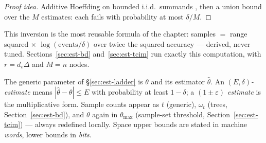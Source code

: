 \begin{proof}[Proof idea]
Additive Hoeffding on bounded i.i.d.\ summands
\citep{estimation-theory-bg3,estimation-theory-bg4}, then a union bound over the $M$ estimates:
each fails with probability at most $\delta/M$.
\end{proof}

This inversion is the most reusable formula of the chapter: samples $=$ range squared $\times$
$\log(\text{events}/\delta)$ over twice the squared accuracy --- derived, never tuned.
Sections~\ref{sec:est-bd} and~\ref{sec:est-tcim} run exactly this computation, with
$r = d_v\Delta$ and $M = n$ nodes.

\begin{widefigure}[t]
\pgfplotsset{compat=1.15}
\caption{The bias--variance ledger: shrinking or capping an unbiased estimator
($\hat\theta \mapsto \lambda\hat\theta$, or the truncations of Sections~\ref{sec:est-fp}
and~\ref{sec:est-sublime}) buys variance at the price of bias; the MSE-optimal
$\lambda^\ast = \theta^2/(\theta^2+\sigma^2)$ balances the two curves, and truncation
estimators sit at an interior point chosen so the bias lands inside the stated factor.}
\label{fig:est-mse}
\end{widefigure}

\begin{remarkbox}[Notation]
The generic parameter of \S\ref{sec:est-ladder} is $\theta$ and its estimator $\hat\theta$. An
\emph{$(E,\delta)$-estimate} means $|\hat\theta - \theta| \le E$ with probability at least
$1-\delta$; a \emph{$(1\pm\varepsilon)$ estimate} is the multiplicative form. Sample counts
appear as $t$ (generic), $\omega_t$ (trees, Section~\ref{sec:est-bd}), and $\theta$ again in
$\theta_{\max}$ (sample-set threshold, Section~\ref{sec:est-tcim}) --- always redefined
locally. Space upper bounds are stated in machine \emph{words}, lower bounds in \emph{bits}.
\end{remarkbox}

